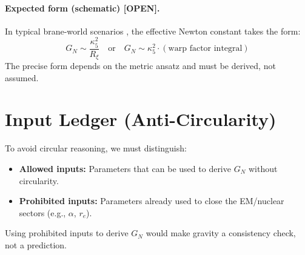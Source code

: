\documentclass[11pt,a4paper]{article}
\newcommand{\tagOPEN}{\textcolor{red!70!black}{[OPEN]}}
\begin{document}
\paragraph{Expected form (schematic) \tagOPEN{}.}
In typical brane-world scenarios \cite{RS1999,Maartens2010}, the effective Newton constant takes the form:
\begin{equation}
    G_N \sim \frac{\kappa_5^2}{R_\xi} \quad \text{or} \quad G_N \sim \kappa_5^2 \cdot (\text{warp factor integral})
    \label{eq:GN_schematic}
\end{equation}
The precise form depends on the metric ansatz and must be derived, not assumed.

\section{Input Ledger (Anti-Circularity)}
\label{sec:ledger}

\begin{warningbox}
To avoid circular reasoning, we must distinguish:
\begin{itemize}[nosep]
    \item \textbf{Allowed inputs:} Parameters that can be used to derive $G_N$ without circularity.
    \item \textbf{Prohibited inputs:} Parameters already used to close the EM/nuclear sectors (e.g., $\alpha$, $r_e$).
\end{itemize}
Using prohibited inputs to derive $G_N$ would make gravity a consistency check, not a prediction.
\end{warningbox}
\end{document}
